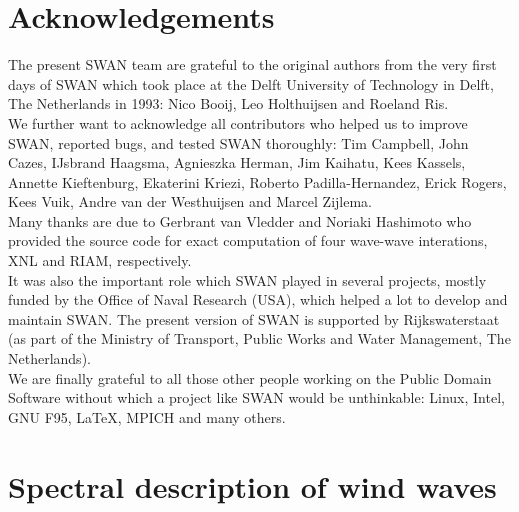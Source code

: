 \documentclass[12pt]{book}
\begin{document}
\section{Acknowledgements} \label{sec:acknow}

The present SWAN team are grateful to the original authors from the very first days of SWAN which took place at
the Delft University of Technology in Delft, The Netherlands in 1993: Nico Booij, Leo Holthuijsen and Roeland Ris.
\\[2ex]
\noindent
We further want to acknowledge all contributors who helped us to improve SWAN, reported bugs, and tested SWAN
thoroughly: Tim Campbell, John Cazes, IJsbrand Haagsma, Agnieszka Herman, Jim Kaihatu, Kees Kassels, Annette Kieftenburg,
Ekaterini Kriezi, Roberto Padilla-Hernandez, Erick Rogers, Kees Vuik, Andre van der Westhuijsen and Marcel Zijlema.
\\[2ex]
\noindent
Many thanks are due to Gerbrant van Vledder and Noriaki Hashimoto who provided the source code for exact
computation of four wave-wave interations, XNL and RIAM, respectively.
\\[2ex]
\noindent
It was also the important role which SWAN played in several projects, mostly funded by the Office of Naval
Research (USA), which helped a lot to develop and maintain SWAN. The present version of SWAN is supported by
Rijkswaterstaat (as part of the Ministry of Transport, Public Works and Water Management, The Netherlands).
\\[2ex]
\noindent
We are finally grateful to all those other people working on the Public Domain Software without which a project
like SWAN would be unthinkable: Linux, Intel, GNU F95, \LaTeX, MPICH and many others.

 \label{ch:goveq}

\section{Spectral description of wind waves}
\end{document}
